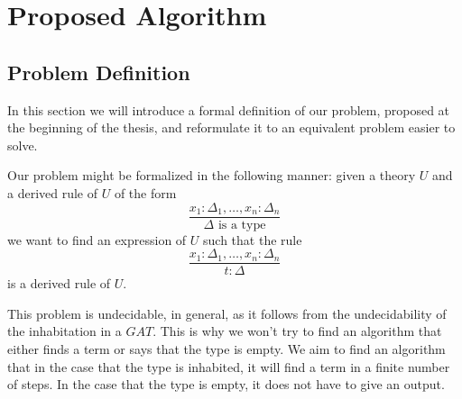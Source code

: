 \chapter{Proposed Algorithm}

\section{Problem Definition}

In this section we will introduce a formal definition of our 
problem, proposed at the beginning of the {\color{red} thesis}, %
and reformulate it to an equivalent problem easier to solve.

Our problem might be formalized in the following manner:
given a theory $U$ and a derived rule of $U$ of the form 
\begin{equation*}
    \dfrac{
        x_1 : \Delta_1, \dots, x_n : \Delta_n
    }{
        \Delta \text{ is a type}
    }
\end{equation*}
we want to find an expression of $U$ such that the rule 
\begin{equation*}
    \dfrac{
        x_1 : \Delta_1, \dots, x_n : \Delta_n
    }{
        t : \Delta 
    }
\end{equation*}
is a derived rule of $U$.

This problem is undecidable, in general, as it follows from the undecidability
of the inhabitation in a $GAT$. This is why we won't try to find
an algorithm that either finds a term or says that the type is empty.
We aim to find an algorithm that in the case that the type is 
inhabited, it will find a term in a finite number of steps.
In the case that the type is empty, it does not have to give an
output.

